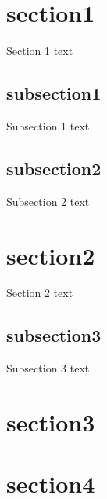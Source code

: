 \documentclass{article}
\begin{document}
 	\tableofcontents
	\newpage
	\section{section1}
	Section 1 text
	\subsection{subsection1}
         Subsection 1 text
	\subsection{subsection2}
	Subsection 2 text
	\section{section2}
	Section 2 text
	\subsection{subsection3}
	Subsection 3 text
	\section{section3}
	\section{section4}
\end{document}
